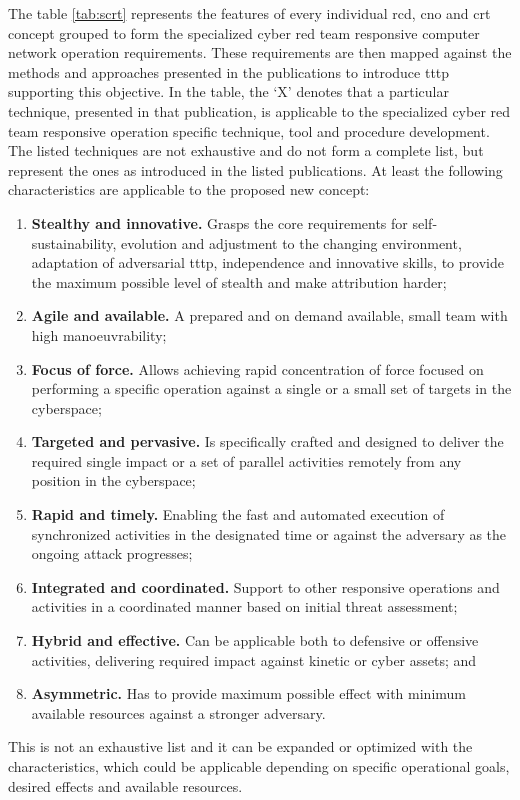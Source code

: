 The table \ref{tab:scrt} represents the features of every individual \gls{rcd}, \gls{cno} and \gls{crt} concept grouped to form the specialized cyber red team responsive computer network operation requirements. These requirements are then mapped against the methods and approaches presented in the publications to introduce \gls{tttp} supporting this objective. In the table, the `X' denotes that a particular technique, presented in that publication, is applicable to the specialized cyber red team responsive operation specific technique, tool and procedure development. The listed techniques are not exhaustive and do not form a complete list, but represent the ones as introduced in the listed publications.
At least the following characteristics are applicable to the proposed new concept:
\begin{enumerate}
    \item \textbf{Stealthy and innovative.} Grasps the core requirements for self-sustainability, evolution and adjustment to the changing environment, adaptation of adversarial \gls{tttp}, independence and innovative skills, to provide the maximum possible level of stealth and make attribution harder;
    \item \textbf{Agile and available.} A prepared and on demand available, small team with high manoeuvrability;
    \item \textbf{Focus of force.} Allows achieving rapid concentration of force focused on performing a specific operation against a single or a small set of targets in the cyberspace;
    \item \textbf{Targeted and pervasive.} Is specifically crafted and designed to deliver the required single impact or a set of parallel activities remotely from any position in the cyberspace;
    \item \textbf{Rapid and timely.} Enabling the fast and automated execution of synchronized activities in the designated time or against the adversary as the ongoing attack progresses;
    \item \textbf{Integrated and coordinated.} Support to other responsive operations and activities in a coordinated manner based on initial threat assessment;
    \item \textbf{Hybrid and effective.} Can be applicable both to defensive or offensive activities, delivering required impact against kinetic or cyber assets; and
    \item \textbf{Asymmetric.} Has to provide maximum possible effect with minimum available resources against a stronger adversary.
\end{enumerate}
This is not an exhaustive list and it can be expanded or optimized with the characteristics, which could be applicable depending on specific operational goals, desired effects and available resources.


